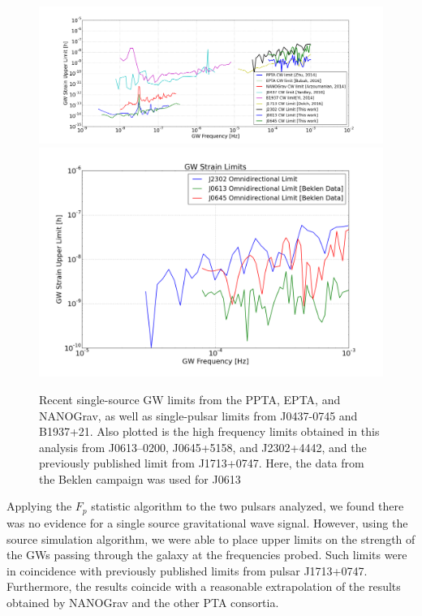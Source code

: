 \documentclass[12pt]{article}
\begin{document}
\begin{figure}
    \caption{Recent single-source GW limits from the PPTA, EPTA, and NANOGrav,
as well as single-pulsar limits from J0437-0745 and B1937+21. Also plotted is
the high frequency limits obtained in this analysis from J0613--0200,
    J0645+5158, and
J2302+4442, and the previously published limit from J1713+0747. Here, the data
    from the Beklen campaign was used for J0613}
    \includegraphics[width=1\textwidth]{./figures/all_limits_incfall.png}
    \includegraphics[width=1\textwidth]{./figures/hf_limits.png}
\end{figure}

Applying the $F_p$ statistic algorithm to the two pulsars analyzed, we found
there was no evidence for a single source gravitational wave signal. However,
using the source simulation algorithm, we were able to place upper limits on the
strength of the GWs passing through the galaxy at the
frequencies probed. Such limits were in coincidence with previously published
limits from pulsar J1713+0747. Furthermore, the results coincide with a
reasonable extrapolation of the results obtained by NANOGrav and the other PTA
consortia.
\end{document}
